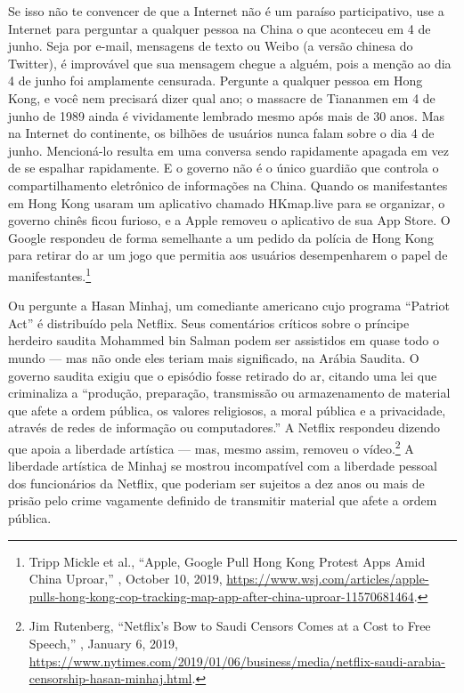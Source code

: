 Se isso não te convencer de que a Internet não é um paraíso participativo, use a Internet
para perguntar a qualquer pessoa na China o que aconteceu em 4 de junho. Seja por e-mail,
mensagens de texto ou Weibo (a versão chinesa do Twitter), é improvável que sua mensagem
chegue a alguém, pois a menção ao dia 4 de junho foi amplamente censurada. Pergunte a
qualquer pessoa em Hong Kong, e você nem precisará dizer qual ano; o massacre de Tiananmen
em 4 de junho de 1989 ainda é vividamente lembrado mesmo após mais de 30 anos. Mas na
Internet do continente, os bilhões de usuários nunca falam sobre o dia 4 de junho.
Mencioná-lo resulta em uma conversa sendo rapidamente apagada em vez de se espalhar
rapidamente. E o governo não é o único guardião que controla o compartilhamento eletrônico
de informações na China. Quando os manifestantes em Hong Kong usaram um aplicativo chamado
HKmap.live para se organizar, o governo chinês ficou furioso, e a Apple removeu o
aplicativo de sua App Store. O Google respondeu de forma semelhante a um pedido da polícia
de Hong Kong para retirar do ar um jogo que permitia aos usuários desempenharem o papel de
manifestantes.\footnote{Tripp Mickle et al., ``Apple, Google Pull Hong Kong Protest Apps
Amid China Uproar,'' , October 10, 2019,
\url{https://www.wsj.com/articles/apple-pulls-hong-kong-cop-tracking-map-app-after-china-uproar-11570681464}.}

Ou pergunte a Hasan Minhaj, um comediante americano cujo programa ``Patriot Act'' é
distribuído pela Netflix. Seus comentários críticos sobre o príncipe herdeiro saudita
Mohammed bin Salman podem ser assistidos em quase todo o mundo --- mas não onde eles
teriam mais significado, na Arábia Saudita. O governo saudita exigiu que o episódio fosse
retirado do ar, citando uma lei que criminaliza a ``produção, preparação, transmissão ou
armazenamento de material que afete a ordem pública, os valores religiosos, a moral pública
e a privacidade, através de redes de informação ou computadores.'' A Netflix respondeu
dizendo que apoia a liberdade artística --- mas, mesmo assim, removeu o vídeo.\footnote{Jim
Rutenberg, ``Netflix’s Bow to Saudi Censors Comes at a Cost to Free Speech,'' , January 6, 2019, \url{https://www.nytimes.com/2019/01/06/business/media/netflix-saudi-arabia-censorship-hasan-minhaj.html}.}
A liberdade artística de Minhaj se mostrou incompatível com a liberdade pessoal dos
funcionários da Netflix, que poderiam ser sujeitos a dez anos ou mais de prisão pelo crime
vagamente definido de transmitir material que afete a ordem pública.


